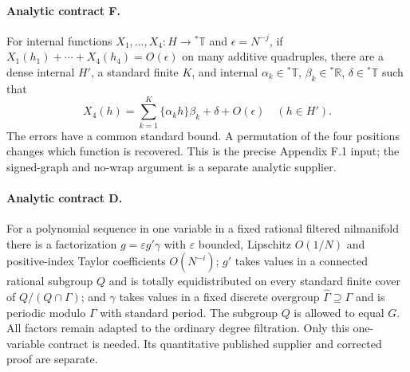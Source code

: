 \documentclass[11pt]{article}
\newcommand{\R}{\mathbb R}\newcommand{\Z}{\mathbb Z}
\newcommand{\T}{\mathbb T}\newcommand{\N}{\mathbb N}
\begin{document}
\paragraph{Analytic contract F.}
For internal functions $X_1,\ldots,X_4:H\to{}^*\T$ and $\epsilon=N^{-j}$,
if $X_1(h_1)+\cdots+X_4(h_4)=O(\epsilon)$ on many additive quadruples,
there are a dense internal $H'$, a standard finite $K$, and internal
$\alpha_k\in{}^*\T$, $\beta_k\in{}^*\R$, $\delta\in{}^*\T$ such that
\[
 X_4(h)=\sum_{k=1}^K\{\alpha_k h\}\beta_k+\delta+O(\epsilon)
 \quad(h\in H').
\]
The errors have a common standard bound. A permutation of the four positions
changes which function is recovered. This is the precise Appendix F.1 input;
the signed-graph and no-wrap argument is a separate analytic supplier.

\paragraph{Analytic contract D.}
For a polynomial sequence in one variable in a fixed rational filtered
nilmanifold there is a factorization $g=\varepsilon g'\gamma$ with
$\varepsilon$ bounded, Lipschitz $O(1/N)$ and positive-index Taylor
coefficients $O(N^{-i})$; $g'$ takes values in a connected rational subgroup
$Q$ and is totally equidistributed on every standard finite cover of
$Q/(Q\cap\Gamma)$; and $\gamma$ takes values in a fixed discrete overgroup
$\widehat\Gamma\supseteq\Gamma$ and is periodic modulo $\Gamma$ with standard
period. The subgroup $Q$ is allowed to equal $G$. All factors remain adapted
to the ordinary degree filtration. Only this one-variable contract is needed.
Its quantitative published supplier and corrected proof are separate.
\end{document}
